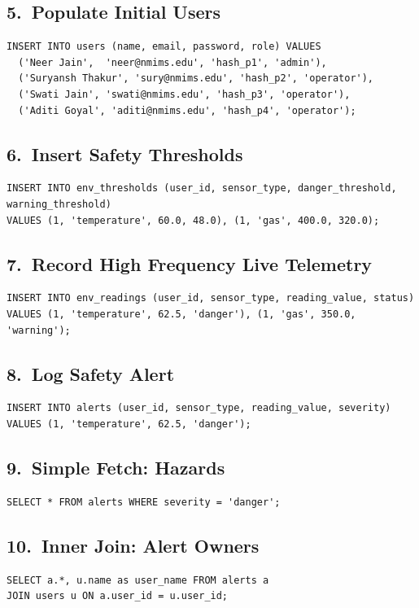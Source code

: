 \documentclass[12pt, a4paper]{article}
\begin{document}
\subsection{5.\ Populate Initial Users}
\begin{lstlisting}
INSERT INTO users (name, email, password, role) VALUES
  ('Neer Jain',  'neer@nmims.edu', 'hash_p1', 'admin'),
  ('Suryansh Thakur', 'sury@nmims.edu', 'hash_p2', 'operator'),
  ('Swati Jain', 'swati@nmims.edu', 'hash_p3', 'operator'),
  ('Aditi Goyal', 'aditi@nmims.edu', 'hash_p4', 'operator');
\end{lstlisting}

\subsection{6.\ Insert Safety Thresholds}
\begin{lstlisting}
INSERT INTO env_thresholds (user_id, sensor_type, danger_threshold, warning_threshold)
VALUES (1, 'temperature', 60.0, 48.0), (1, 'gas', 400.0, 320.0);
\end{lstlisting}

\subsection{7.\ Record High Frequency Live Telemetry}
\begin{lstlisting}
INSERT INTO env_readings (user_id, sensor_type, reading_value, status)
VALUES (1, 'temperature', 62.5, 'danger'), (1, 'gas', 350.0, 'warning');
\end{lstlisting}

\subsection{8.\ Log Safety Alert}
\begin{lstlisting}
INSERT INTO alerts (user_id, sensor_type, reading_value, severity)
VALUES (1, 'temperature', 62.5, 'danger');
\end{lstlisting}

\subsection{9.\ Simple Fetch: Hazards}
\begin{lstlisting}
SELECT * FROM alerts WHERE severity = 'danger';
\end{lstlisting}

\subsection{10.\ Inner Join: Alert Owners}
\begin{lstlisting}
SELECT a.*, u.name as user_name FROM alerts a
JOIN users u ON a.user_id = u.user_id;
\end{lstlisting}
\end{document}
